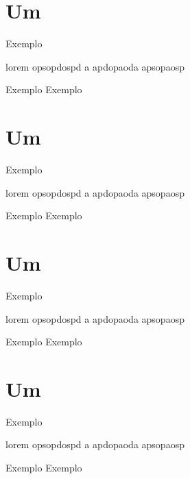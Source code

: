 \documentclass[a4paper,10pt]{article}
\begin{document}
\section{Um}

Exemplo

lorem opsopdospd
a apdopaoda
 apsopaosp

Exemplo
Exemplo

\section{Um}

Exemplo

lorem opsopdospd
a apdopaoda
 apsopaosp

Exemplo
Exemplo

\section{Um}

Exemplo

lorem opsopdospd
a apdopaoda
 apsopaosp

Exemplo
Exemplo

\section{Um}

Exemplo

lorem opsopdospd
a apdopaoda
 apsopaosp

Exemplo
Exemplo
\end{document}
